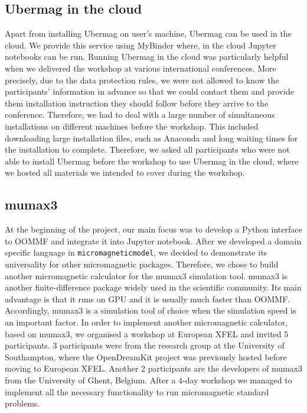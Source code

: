 \documentclass{deliverablereport}
\begin{document}
\subsection{Ubermag in the cloud}

Apart from installing Ubermag on user's machine, Ubermag can be used in the cloud. We provide this service using MyBinder where, in the cloud Jupyter notebooks can be run. Running Ubermag in the cloud was particularly helpful when we delivered the workshop at various international conferences. More precisely, due to the data protection rules, we were not allowed to know the participants' information in advance so that we could contact them and provide them installation instruction they should follow before they arrive to the conference. Therefore, we had to deal with a large number of simultaneous installations on different machines before the workshop. This included downloading large installation files, such as Anaconda and long waiting times for the installation to complete. Therefore, we asked all participants who were not able to install Ubermag before the workshop to use Ubermag in the cloud, where we hosted all materials we intended to cover during the workshop.

\subsection{mumax3}

At the beginning of the project, our main focus was to develop a Python interface to OOMMF and integrate it into Jupyter notebook. After we developed a domain specific language in \texttt{micromagneticmodel}, we decided to demonstrate its universality for other micromagnetic packages. Therefore, we chose to build another micromagnetic calculator for the mumax3 simulation tool. mumax3 is another finite-difference package widely used in the scientific community. Its main advantage is that it runs on GPU and it is usually much faster than OOMMF. Accordingly, mumax3 is a simulation tool of choice when the simulation speed is an important factor. In order to implement another micromagnetic calculator, based on mumax3, we organised a workshop at European XFEL and invited 5 participants. 3 participants were from the research group at the University of Southampton, where the OpenDreamKit project was previously hosted before moving to European XFEL. Another 2 participants are the developers of mumax3 from the University of Ghent, Belgium. After a 4-day workshop we managed to implement all the necessary functionality to run micromagnetic standard problems.
\end{document}
